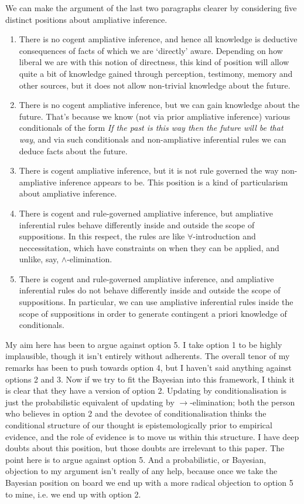 We can make the argument of the last two paragraphs clearer by considering five distinct positions about ampliative inference.

\begin{enumerate}
\item There is no cogent ampliative inference, and hence all knowledge is deductive consequences of facts of which we are `directly' aware. Depending on how liberal we are with this notion of directness, this kind of position will allow quite a bit of knowledge gained through perception, testimony, memory and other sources, but it does not allow non-trivial knowledge about the future.
\item There is no cogent ampliative inference, but we can gain knowledge about the future. That's because we know (not via prior ampliative inference) various conditionals of the form \textit{If the past is this way then the future will be that way}, and via such conditionals and non-ampliative inferential rules we can deduce facts about the future.
\item There is cogent ampliative inference, but it is not rule governed the way non-ampliative inference appears to be. This position is a kind of particularism about ampliative inference.
\item There is cogent and rule-governed ampliative inference, but ampliative inferential rules behave differently inside and outside the scope of suppositions. In this respect, the rules are like $\forall$-introduction and neccessitation, which have constraints on when they can be applied, and unlike, say, $\wedge$-elimination.
\item There is cogent and rule-governed ampliative inference, and ampliative inferential rules do not behave differently inside and outside the scope of suppositions. In particular, we can use ampliative inferential rules inside the scope of suppositions in order to generate contingent a priori knowledge of conditionals.
\end{enumerate}

\noindent My aim here has been to argue against option 5. I take option 1 to be highly implausible, though it isn't entirely without adherents. The overall tenor of my remarks has been to push towards option 4, but I haven't said anything against options 2 and 3. Now if we try to fit the Bayesian into this framework, I think it is clear that they have a version of option 2. Updating by conditionalisation is just the probabilistic equivalent of updating by $\rightarrow$-elimination; both the person who believes in option 2 and the devotee of conditionalisation thinks the conditional structure of our thought is epistemologically prior to empirical evidence, and the role of evidence is to move us within this structure. I have deep doubts about this position, but those doubts are irrelevant to this paper. The point here is to argue against option 5. And a probabilistic, or Bayesian, objection to my argument isn't really of any help, because once we take the Bayesian position on board we end up with a more radical objection to option 5 to mine, i.e. we end up with option 2.

